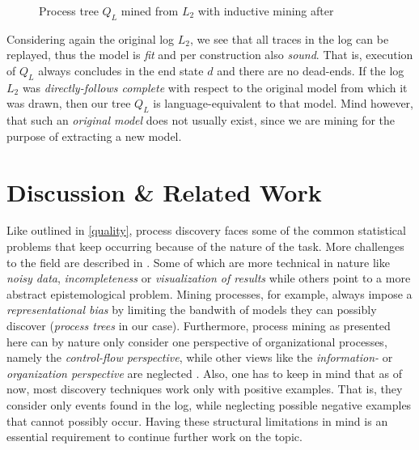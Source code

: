 \documentclass[a4paper]{IEEEtran}
\begin{document}
\begin{figure}[h!]
    \centering
    \usetikzlibrary{graphdrawing.trees}
\caption{ Process tree $Q_L$ mined from $L_2$ with inductive mining after \cite{inductivemining-constructive}}
\label{fig:mined_tree}
\end{figure}
Considering again the original log $L_2$, we see that all traces in the log can be replayed, thus the model is \textit{fit} and per construction also \textit{sound}. That is, execution of $Q_L$ always concludes in the end state $d$ and there are no dead-ends. If the log $L_2$ was \textit{directly-follows complete} with respect to the original model from which it was drawn, then our tree $Q_L$ is language-equivalent to that model. Mind however, that such an \textit{original model} does not usually exist, since we are mining for the purpose of extracting a new model.

\section{Discussion \& Related Work}
\label{sec:related}
Like outlined in \ref{quality}, process discovery faces some of the common statistical problems that keep occurring because of the nature of the task. More challenges to the field are described in \cite{van2004processagenda}. Some of which are more technical in nature like \textit{noisy data}, \textit{incompleteness} or \textit{visualization of results} while others point to a more abstract epistemological problem. Mining processes, for example, always impose a \textit{representational bias} by limiting the bandwith of models they can possibly discover (\textit{process trees} in our case). Furthermore, process mining as presented here can by nature only consider one perspective of organizational processes, namely the \textit{control-flow perspective}, while other views like the \textit{information-} or \textit{organization perspective} are neglected \cite{van2004processagenda}. Also, one has to keep in mind that as of now, most discovery techniques work only with positive examples. That is, they consider only events found in the log, while neglecting possible negative examples that cannot possibly occur. 
Having these structural limitations in mind is an essential requirement to continue further work on the topic. 
\end{document}
